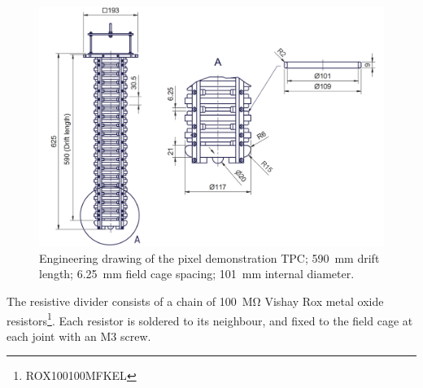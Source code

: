 \documentclass[a4paper]{article}
\begin{document}
\begin{figure}[!ht]
\centering
\includegraphics[width=0.9\linewidth]{Figures/Schematic.png}
\caption{\small Engineering drawing of the pixel demonstration TPC; \SI{590}{\milli\metre} drift length; \SI{6.25}{\milli\metre} field cage spacing; \SI{101}{\milli\metre} internal diameter.}
\label{fig:schematic}
\end{figure}
 
The resistive divider consists of a chain of \SI{100}{\mega\ohm} Vishay Rox metal oxide resistors\footnote{ROX100100MFKEL}. Each resistor is soldered to its neighbour, and fixed to the field cage at each joint with an M3 screw.   
\end{document}
